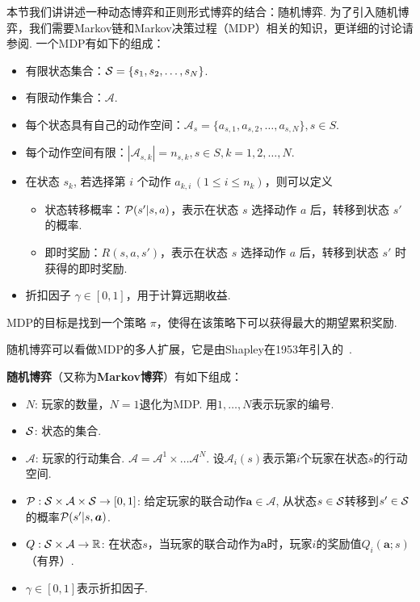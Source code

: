 本节我们讲讲述一种动态博弈和正则形式博弈的结合：随机博弈. 为了引入随机博弈，我们需要Markov链和Markov决策过程（MDP）相关的知识，更详细的讨论请参阅. 一个MDP有如下的组成：
\begin{itemize}
\item 有限状态集合：$\mathcal S=\{s_1,s_2,\dots,s_N\}$.
\item 有限动作集合：$\mathcal A$.
\item 每个状态具有自己的动作空间：$\mathcal A_s = \{a_{s,1},a_{s,2},\dots, a_{s,N}\}, s\in S$.
\item 每个动作空间有限：$|\mathcal A_{s,k}|=n_{s,k}, s\in S, k=1,2,\dots,N$.
\item 在状态 $s_k$, 若选择第 $i$ 个动作 $a_{k,i}\,(1\leq i\leq n_{k})$，则可以定义
\begin{itemize}
        \item 状态转移概率：$\mathcal P(s'|s,a)$，表示在状态 $s$ 选择动作 $a$ 后，转移到状态 $s'$ 的概率. 
        \item 即时奖励：$R(s,a,s')$，表示在状态 $s$ 选择动作 $a$ 后，转移到状态 $s'$ 时获得的即时奖励. 
   \end{itemize}
\item 折扣因子 $\gamma\in[0,1]$，用于计算远期收益.
\end{itemize}
MDP的目标是找到一个策略 $\pi$，使得在该策略下可以获得最大的期望累积奖励. 

随机博弈可以看做MDP的多人扩展，它是由Shapley在1953年引入的~\cite{shapleyStochasticGames1953}.

\begin{definition}
\textbf{随机博弈}（又称为\textbf{Markov博弈}）有如下组成：
\begin{itemize}
\item $N$: 玩家的数量，$N=1$退化为MDP. 用$1,\dots,N$表示玩家的编号.
\item $\mathcal S$: 状态的集合.
\item $\mathcal A$: 玩家的行动集合. $\mathcal A=\mathcal A^1\times \dots\mathcal A^N$. 设$\mathcal A_i(s)$表示第$i$个玩家在状态$s$的行动空间.
\item $\mathcal P: \mathcal S\times \mathcal A\times \mathcal S\to [0,1]$: 给定玩家的联合动作$\boldsymbol a\in\mathcal A$, 从状态$s\in \mathcal S$转移到$s'\in \mathcal S$的概率$\mathcal P(s'|s,\boldsymbol a)$.
\item $Q: \mathcal S\times \mathcal A\to \mathbb{R}$: 在状态$s$，当玩家的联合动作为$\boldsymbol a$时，玩家$i$的奖励值$Q_i(\boldsymbol a;s)$（有界）.
\item $\gamma\in[0,1]$表示折扣因子.
\end{itemize}
\end{definition}

